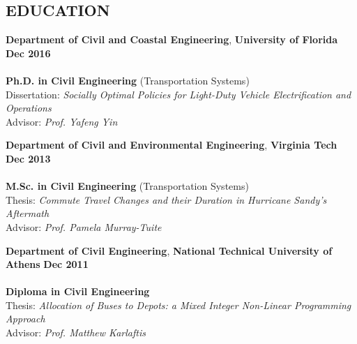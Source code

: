 \documentclass[margin,line]{resume}
\begin{document}
\begin{resume}
    
     	  \vspace{-0.2in}

    \section{\mysidestyle \bf EDUCATION}

    \textbf{Department of Civil and Coastal Engineering}, \textbf{University of Florida} \hfill \textbf{Dec 2016}\vspace{-3mm}\\\vspace{-1mm}%
   \\ \textbf{Ph.D. in Civil Engineering} (Transportation Systems) \\
        Dissertation: \emph{Socially Optimal Policies for Light-Duty Vehicle Electrification and Operations} \\
        Advisor: \emph{Prof. Yafeng Yin}
        
        
     \textbf{Department of Civil and Environmental Engineering}, \textbf{Virginia Tech} \hfill \textbf{Dec 2013}\vspace{-3mm}\\\vspace{-1mm}%
 \\ \textbf{M.Sc. in Civil Engineering} (Transportation Systems)\\
Thesis: \emph{Commute Travel Changes and their Duration in Hurricane Sandy's Aftermath} \\
   Advisor: \emph{Prof. Pamela Murray-Tuite}

     \textbf{Department of Civil Engineering}, \textbf{National Technical University of Athens} \hfill \textbf{Dec 2011}\vspace{-3mm}\\\vspace{-1mm}%
\\  \textbf{Diploma in Civil Engineering} \\
Thesis: \emph{Allocation of Buses to Depots: a Mixed Integer Non-Linear Programming Approach} \\
   Advisor: \emph{Prof. Matthew Karlaftis}
	


\end{resume}
\end{document}
